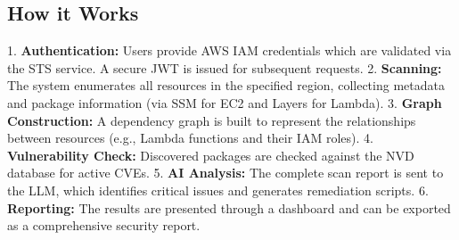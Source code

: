 \subsection{How it Works}
1. \textbf{Authentication:} Users provide AWS IAM credentials which are validated via the STS service. A secure JWT is issued for subsequent requests.
2. \textbf{Scanning:} The system enumerates all resources in the specified region, collecting metadata and package information (via SSM for EC2 and Layers for Lambda).
3. \textbf{Graph Construction:} A dependency graph is built to represent the relationships between resources (e.g., Lambda functions and their IAM roles).
4. \textbf{Vulnerability Check:} Discovered packages are checked against the NVD database for active CVEs.
5. \textbf{AI Analysis:} The complete scan report is sent to the LLM, which identifies critical issues and generates remediation scripts.
6. \textbf{Reporting:} The results are presented through a dashboard and can be exported as a comprehensive security report.

